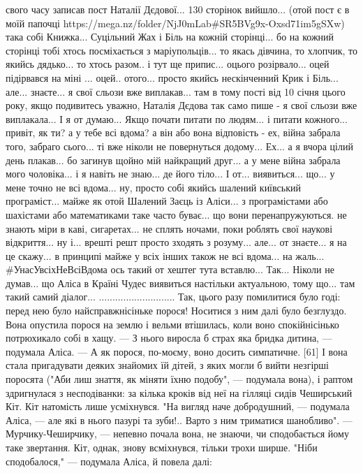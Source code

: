 свого часу записав пост Наталії Дєдової... 130 сторінок вийшло... (отой пост є в моїй папочці https://mega.nz/folder/NjJ0mLab#SR5BVg9x-Oxsd71im5gSXw) така собі Книжка... Суцільний Жах і Біль на кожній сторінці... бо на кожний сторінці тобі хтось посміхається з маріупольців... то якась дівчина, то хлопчик, то якийсь дядько... то хтось разом.. і тут ще припис... оцього розірвало... оцей підірвався на міні ... оцей.. отого... просто якийсь нескінченний Крик і Біль... але... знаєте... я свої сльози вже виплакав... там в тому пості від 10 січня цього року, якщо подивитесь уважно, Наталія Дєдова так само пише - я свої сльози вже виплакала...
І я от думаю...
Якщо почати питати по людям... і питати кожного... привіт, як ти? а у тебе всі вдома? а він або вона відповість - ех, війна забрала того, забраго сього... ті вже ніколи не повернуться додому... Ех... а я вчора цілий день плакав... бо загинув щойно мій найкращий друг... а у мене війна забрала мого чоловіка... і я навіть не знаю... де його тіло... І от... виявиться... що... у мене точно не всі вдома... ну, просто собі якийсь шалений київський програміст... майже як отой Шалений Заєць із Аліси... з програмістами або шахістами або математиками таке часто буває... що вони перенапружуються. не знають міри в каві, сигаретах... не сплять ночами, поки роблять свої наукові відкриття... ну і... врешті решт просто зходять з розуму... але... от знаєте... я на це скажу... в принципі майже у всіх інших також не всі вдома... на жаль...
#УнасУвсіхНеВсіВдома ось такий от хештег тута вставлю...
Так... Ніколи не думав... що Аліса в Країні Чудес виявиться настільки актуальною, тому що... там такий самий діалог...
............................
Так, цього разу помилитися було годі: перед нею було найсправжнісіньке порося! Носитися з ним далі було безглуздо. Вона опустила порося на землю і вельми втішилась, коли воно спокійнісінько потрюхикало собі в хащу.
— З нього виросла б страх яка бридка дитина, — подумала Аліса. — А як порося, по-моєму, воно досить симпатичне. [61]
І вона стала пригадувати деяких знайомих їй дітей, з яких могли б вийти незгірші поросята ("Аби лиш знаття, як міняти їхню подобу", — подумала вона), і раптом здригнулася з несподіванки: за кілька кроків від неї на гілляці сидів Чеширський Кіт.
Кіт натомість лише усміхнувся.
"На вигляд наче добродушний, — подумала Аліса, — але які в нього пазурі та зуби!.. Варто з ним триматися шанобливо".
— Мурчику-Чеширчику, — непевно почала вона, не знаючи, чи сподобається йому таке звертання.
Кіт, однак, знову всміхнувся, тільки трохи ширше.
"Ніби сподобалося," — подумала Аліса, й повела далі:
